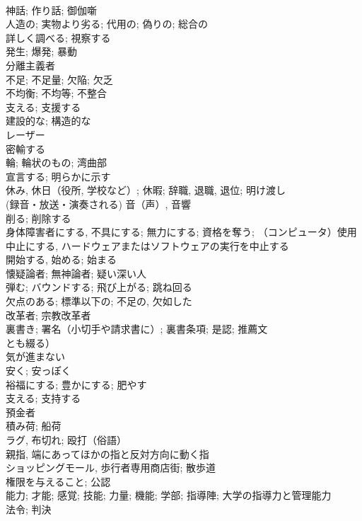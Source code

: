 \documentclass[8pt]{extreport}
\begin{document}
\begin{CJK}{UTF8}{min}
\\	神話; 作り話; 御伽噺	
\\	人造の; 実物より劣る; 代用の; 偽りの; 総合の	
\\	詳しく調べる; 視察する	
\\	発生; 爆発; 暴動	
\\	分離主義者	
\\	不足; 不足量; 欠陥; 欠乏	
\\	不均衡; 不均等; 不整合	
\\	支える; 支援する	
\\	建設的な; 構造的な	
\\	レーザー	
\\	密輸する	
\\	輪; 輪状のもの; 湾曲部	
\\	宣言する; 明らかに示す	
\\	休み, 休日（役所, 学校など）; 休暇; 辞職, 退職, 退位; 明け渡し	
\\	(録音・放送・演奏される) 音（声）, 音響	
\\	削る; 削除する	
\\	身体障害者にする, 不具にする; 無力にする; 資格を奪う; （コンピュータ）使用中止にする, ハードウェアまたはソフトウェアの実行を中止する	
\\	開始する, 始める; 始まる	
\\	懐疑論者; 無神論者; 疑い深い人	
\\	弾む; バウンドする; 飛び上がる; 跳ね回る	
\\	欠点のある; 標準以下の; 不足の, 欠如した	
\\	改革者; 宗教改革者	
\\	裏書き; 署名（小切手や請求書に）; 裏書条項; 是認; 推薦文
\\	とも綴る）	
\\	気が進まない	
\\	安く; 安っぽく	
\\	裕福にする; 豊かにする; 肥やす	
\\	支える; 支持する	
\\	預金者	
\\	積み荷; 船荷	
\\	ラグ, 布切れ; 殴打（俗語）	
\\	親指, 端にあってほかの指と反対方向に動く指	
\\	ショッピングモール, 歩行者専用商店街; 散歩道	
\\	権限を与えること; 公認	
\\	能力; 才能; 感覚; 技能; 力量; 機能; 学部; 指導陣; 大学の指導力と管理能力	
\\	法令; 判決	

\end{CJK}
\end{document}
